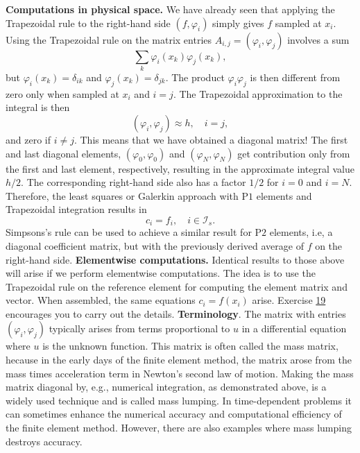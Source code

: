 \documentclass[../main.tex]{subfiles}
\begin{document}
\noindent \textbf{Computations in physical space.} We have already seen that applying the Trapezoidal rule to the right-hand side $\left(f, \varphi_{i}\right)$ simply gives $f$ sampled at $x_{i}$. Using the Trapezoidal rule on the matrix entries $A_{i, j}=\left(\varphi_{i}, \varphi_{j}\right)$ involves a sum
$$
\sum_{k} \varphi_{i}\left(x_{k}\right) \varphi_{j}\left(x_{k}\right),
$$
but $\varphi_{i}\left(x_{k}\right)=\delta_{i k}$ and $\varphi_{j}\left(x_{k}\right)=\delta_{j k}$. The product $\varphi_{i} \varphi_{j}$ is then different from zero only when sampled at $x_{i}$ and $i=j$. The Trapezoidal approximation to the integral is then
$$
\left(\varphi_{i}, \varphi_{j}\right) \approx h, \quad i=j,
$$
and zero if $i \neq j$. This means that we have obtained a diagonal matrix! The first and last diagonal elements, $\left(\varphi_{0}, \varphi_{0}\right)$ and $\left(\varphi_{N}, \varphi_{N}\right)$ get contribution only from the first and last element, respectively, resulting in the approximate integral value $h / 2$. The corresponding right-hand side also has a factor $1 / 2$ for $i=0$ and $i=N$. Therefore, the least squares or Galerkin approach with $\mathrm{P} 1$ elements and Trapezoidal integration results in
$$
c_{i}=f_{i}, \quad i \in \mathcal{I}_{s} .
$$
Simpsons's rule can be used to achieve a similar result for $\mathrm{P} 2$ elements, i.e, a diagonal coefficient matrix, but with the previously derived average of $f$ on the right-hand side.
\bigbreak
\noindent \textbf{Elementwise computations.} Identical results to those above will arise if we perform elementwise computations. The idea is to use the Trapezoidal rule on the reference element for computing the element matrix and vector. When assembled, the same equations $c_{i}=f\left(x_{i}\right)$ arise. Exercise \hyperref[sec:sec_10_19]{19} encourages you to carry out the details.
\bigbreak
\noindent \textbf{Terminology}. The matrix with entries $\left(\varphi_{i}, \varphi_{j}\right)$ typically arises from terms proportional to $u$ in a differential equation where $u$ is the unknown function. This matrix is often called the mass matrix, hecause in the early days of the finite element method, the matrix arose from the mass times acceleration term in Newton's second law of motion. Making the mass matrix diagonal by, e.g., numerical integration, as demonstrated above, is a widely used technique and is called mass lumping. In time-dependent problems it can sometimes enhance the numerical accuracy and computational efficiency of the finite element method. However, there are also examples where mass lumping destroys accuracy.
\end{document}
